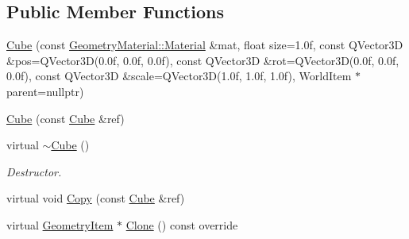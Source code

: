 \subsection*{Public Member Functions}
\begin{DoxyCompactItemize}
\item 
\mbox{\hyperlink{class_geometry_engine_1_1_geometry_world_item_1_1_geometry_item_1_1_cube_a3971e98ccf681ba9dfae15b33ae0ca22}{Cube}} (const \mbox{\hyperlink{class_geometry_engine_1_1_geometry_material_1_1_material}{Geometry\+Material\+::\+Material}} \&mat, float size=1.\+0f, const Q\+Vector3\+D \&pos=\+Q\+Vector3\+D(0.\+0f, 0.\+0f, 0.\+0f), const Q\+Vector3\+D \&rot=\+Q\+Vector3\+D(0.\+0f, 0.\+0f, 0.\+0f), const Q\+Vector3\+D \&scale=\+Q\+Vector3\+D(1.\+0f, 1.\+0f, 1.\+0f), World\+Item $\ast$parent=nullptr)
\item 
\mbox{\hyperlink{class_geometry_engine_1_1_geometry_world_item_1_1_geometry_item_1_1_cube_a159c3e7e79d19df2a9857fc6b77d5955}{Cube}} (const \mbox{\hyperlink{class_geometry_engine_1_1_geometry_world_item_1_1_geometry_item_1_1_cube}{Cube}} \&ref)
\item 
\mbox{\label{class_geometry_engine_1_1_geometry_world_item_1_1_geometry_item_1_1_cube_a08410ebbd8eb4adce0706505e0150ba1}} 
virtual \mbox{\hyperlink{class_geometry_engine_1_1_geometry_world_item_1_1_geometry_item_1_1_cube_a08410ebbd8eb4adce0706505e0150ba1}{$\sim$\+Cube}} ()
\begin{DoxyCompactList}\small\item\em Destructor. \end{DoxyCompactList}\item 
virtual void \mbox{\hyperlink{class_geometry_engine_1_1_geometry_world_item_1_1_geometry_item_1_1_cube_a36f20733aaadc9ab22a72eb87436b900}{Copy}} (const \mbox{\hyperlink{class_geometry_engine_1_1_geometry_world_item_1_1_geometry_item_1_1_cube}{Cube}} \&ref)
\item 
virtual \mbox{\hyperlink{class_geometry_engine_1_1_geometry_world_item_1_1_geometry_item_1_1_geometry_item}{Geometry\+Item}} $\ast$ \mbox{\hyperlink{class_geometry_engine_1_1_geometry_world_item_1_1_geometry_item_1_1_cube_ab151cd962c45bc06d21e9e26c2d1c4aa}{Clone}} () const override
\end{DoxyCompactItemize}
